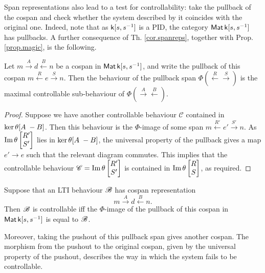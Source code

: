 Span representations also lead to a test for controllability: take
the pullback of the cospan and check whether the system described by it
coincides with the original one. Indeed, note that as ${\mathsf{k}[s,s^{-1}]}$ is a PID, the
category $\operatorname{\mathsf{Mat}}{\mathsf{k}[s,s^{-1}]}$ has pullbacks. A further consequence of Th.
\ref{cor.spanreps}, together with Prop.  \ref{prop.magic}, is the following. 

\begin{proposition} \label{prop.ctrlablepart}
  Let $m \xrightarrow{A} d \xleftarrow{B} n$ be a cospan in $\operatorname{\mathsf{Mat}}{\mathsf{k}[s,s^{-1}]}$, and write
  the pullback of this cospan $m \xleftarrow{R} e \xrightarrow{S} n$. Then the
  behaviour of the pullback span $\Phi(\xleftarrow{R}\xrightarrow{S})$ is
  the maximal controllable sub-behaviour of
  $\Phi(\xrightarrow{A}\xleftarrow{B})$.
\end{proposition}
\begin{proof}
  Suppose we have another controllable behaviour $\mathscr{C}$ contained in
  $\ker\theta [A\;-B]$. Then this behaviour is the $\Phi$-image of some span
  $m \xleftarrow{R'} e' \xrightarrow{S'}n$. As $\mathrm{Im}\,\theta\begin{bmatrix} R' \\
    S'\end{bmatrix}$ lies in $\ker\theta [A\;-B]$, the universal property of
  the pullback gives a map $e' \to e$ such that the relevant diagram commutes.
  This implies that the controllable behaviour $\mathscr{C} =
  \mathrm{Im}\,\theta\begin{bmatrix} R' \\ S'\end{bmatrix}$ is contained in $\mathrm{Im}\,\theta
  \begin{bmatrix} R \\ S\end{bmatrix}$, as required. 
\end{proof}

\begin{corollary}
  Suppose that an LTI behaviour ${\mathscr B}$ has cospan representation
  \[
    m \stackrel{A}\longrightarrow d \stackrel{B}\longleftarrow n.
  \]
  Then ${\mathscr B}$ is controllable iff the $\Phi$-image of the pullback of this cospan
  in $\operatorname{\mathsf{Mat}}{\mathsf{k}[s,s^{-1}]}$ is equal to ${\mathscr B}$.
\end{corollary}

Moreover, taking the pushout of this pullback span gives another cospan. The
morphism from the pushout to the original cospan, given by the universal
property of the pushout, describes the way in which the system fails to be
controllable.

